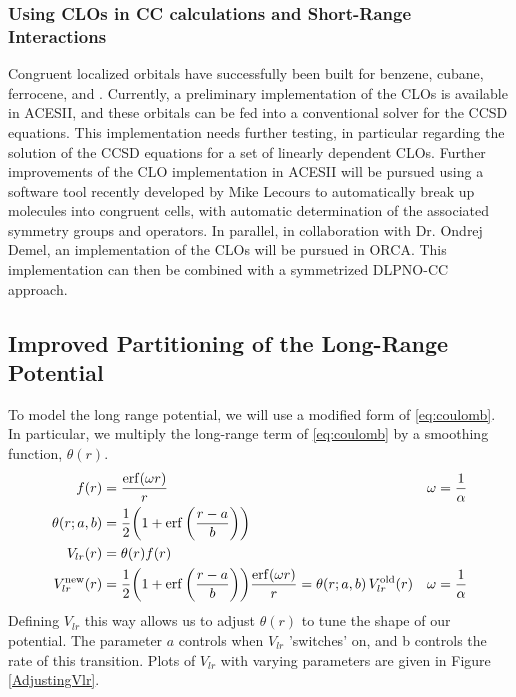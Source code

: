 \documentclass[letterpaper, 12pt]{article}
\begin{document}
\subsubsection{Using CLOs in CC calculations and Short-Range Interactions}
Congruent localized orbitals have successfully been built for benzene, cubane, ferrocene, and . Currently, a preliminary implementation of the CLOs is available in ACESII, and these orbitals can be fed into a conventional solver for the CCSD equations. This implementation needs further testing, in particular regarding the solution of the CCSD equations for a set of linearly dependent CLOs. Further improvements of the CLO implementation in ACESII will be pursued using a software tool recently developed by Mike Lecours to automatically break up molecules into congruent cells, with automatic determination of the associated symmetry groups and operators. In parallel, in collaboration with Dr. Ondrej Demel, an implementation of the CLOs will be pursued in ORCA. This implementation can then be combined with a symmetrized DLPNO-CC approach. 

\subsection{Improved Partitioning of the Long-Range Potential}
To model the long range potential, we will use a modified form of \eqref{eq:coulomb}. In particular, we multiply the long-range term of \eqref{eq:coulomb} by a smoothing function, $\theta(r)$. 
\begin{align}
f(r)&=\frac{\erf(\omega r)}{r} & \omega=\frac{1}{\alpha} \\
\theta (r;a,b)&=\frac{1}{2}\bigg(1+\erf\bigg({\frac{r-a}{b}}\bigg)\bigg)\\
V_{lr}(r) &= \theta(r) f(r)\\
V^{\text{new}}_{lr}(r) &=  \frac{1}{2} \bigg(1+\erf\bigg({\frac{r-a}{b}}\bigg)\bigg)\frac{\erf(\omega r)}{r} = \theta(r;a,b) \, V^{\text{old}}_{lr}(r) & \omega=\frac{1}{\alpha}
\end{align}
Defining $V_{lr}$ this way allows us to adjust $\theta(r)$ to tune the shape of our potential. The parameter $a$ controls when $V_{lr}$ 'switches' on, and b controls the rate of this transition. Plots of $V_{lr}$ with varying parameters are given in Figure \ref{AdjustingVlr}. \medskip \newline
\end{document}
